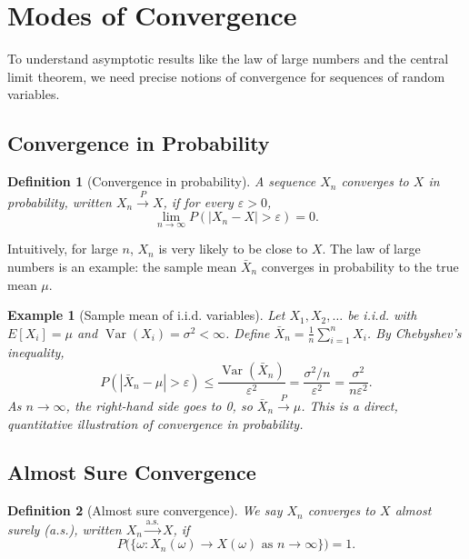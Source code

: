 \documentclass[11pt,a4paper]{article}
\newtheorem{definition}{Definition}[section]
\newtheorem{example}{Example}[section]
\begin{document}
\newpage

\section{Modes of Convergence}
\label{sec:convergence}

To understand asymptotic results like the law of large numbers and the central limit theorem, we need precise notions of convergence for sequences of random variables.

\subsection{Convergence in Probability}

\begin{definition}[Convergence in probability]
A sequence $X_n$ converges to $X$ in probability, written $X_n \xrightarrow{P} X$, if for every $\varepsilon > 0$,
\[
\lim_{n\to\infty} P(|X_n - X| > \varepsilon) = 0.
\]
\end{definition}

Intuitively, for large $n$, $X_n$ is very likely to be close to $X$. 
The law of large numbers is an example: the sample mean $\bar{X}_n$ converges in probability to the true mean $\mu$.

\begin{example}[Sample mean of i.i.d. variables]
Let $X_1, X_2, \dots$ be i.i.d. with $E[X_i] = \mu$ and $\operatorname{Var}(X_i) = \sigma^2 < \infty$. 
Define $\bar{X}_n = \frac{1}{n}\sum_{i=1}^n X_i$. 
By Chebyshev's inequality,
\[
P(|\bar{X}_n - \mu| > \varepsilon)
\le \frac{\operatorname{Var}(\bar{X}_n)}{\varepsilon^2}
= \frac{\sigma^2/n}{\varepsilon^2} = \frac{\sigma^2}{n\varepsilon^2}.
\]
As $n \to \infty$, the right-hand side goes to 0, so $\bar{X}_n \xrightarrow{P} \mu$. 
This is a direct, quantitative illustration of convergence in probability.

\end{example}

\subsection{Almost Sure Convergence}

\begin{definition}[Almost sure convergence]
We say $X_n$ converges to $X$ almost surely (a.s.), written $X_n \xrightarrow{\text{a.s.}} X$, if
\[
P\big(\{\omega : X_n(\omega) \to X(\omega) \text{ as } n\to\infty\}\big) = 1.
\]
\end{definition}
\end{document}
